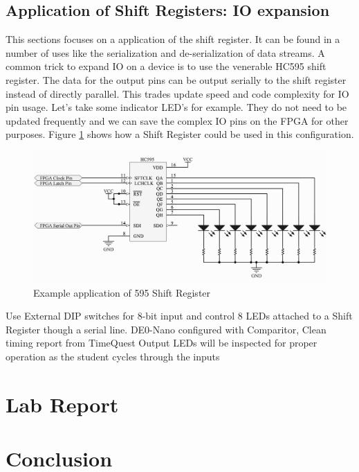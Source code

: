    \subsection{Application of Shift Registers: IO expansion}
    This sections focuses on a application of the shift register. It can be found in a number of uses like the serialization and de-serialization of data streams. A common trick to expand IO on a device is to use the venerable HC595 shift register. The data for the output pins can be output serially to the shift register instead of directly parallel. This trades update speed and code complexity for IO pin usage. Let's take some indicator LED's for example. They do not need to be updated frequently and we can save the complex IO pins on the FPGA for other purposes.  Figure \ref{SR} shows how a Shift Register could be used in this configuration.

    \begin{figure}[H]
      \includegraphics[width=.48\textwidth]{Schematics/ShiftRegister.png}
      \caption{Example application of 595 Shift Register}
      \label{SR}
    \end{figure}

      {Use External DIP switches for 8-bit input and control 8 LEDs attached to a Shift Register though a serial line.}
      {DE0-Nano configured with Comparitor, Clean timing report from TimeQuest}
      {Output LEDs will be inspected for proper operation as the student cycles through the inputs}


\section{\bfseries  Lab Report}
  
\section{\bfseries  Conclusion}
 


